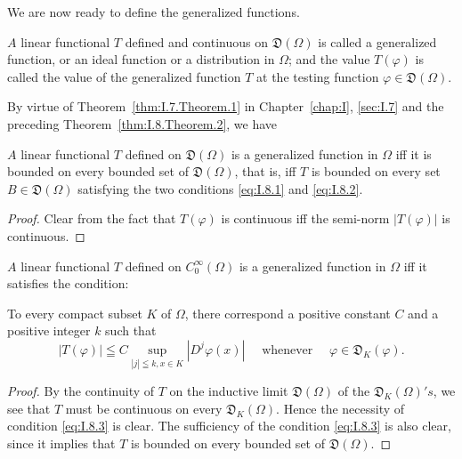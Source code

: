 We are now ready to define the generalized functions. 

\begin{definition}\label{def:I.8.Definition.1} $A$ linear functional $T$ defined and continuous on $\mathfrak{D}(\Omega)$ is called a generalized function, or an ideal function or a distribution in $\Omega$; and the value $T(\varphi)$ is called the value of the generalized function $T$ at the testing function $\varphi \in \mathfrak{D}(\Omega)$. 
\end{definition}

By virtue of Theorem~\ref{thm:I.7.Theorem.1} in Chapter~\ref{chap:I}, \ref{sec:I.7} and the preceding Theorem~\ref{thm:I.8.Theorem.2}, we have 

\begin{proposition}\label{prop:I.8.Proposition.1} $A$ linear functional $T$ defined on $\mathfrak{D}(\Omega)$ is a generalized function in $\Omega$ iff it is bounded on every bounded set of $\mathfrak{D}(\Omega)$, that is, iff $T$ is bounded on every set $B \in \mathfrak{D}(\Omega)$ satisfying the two conditions \eqref{eq:I.8.1} and \eqref{eq:I.8.2}. 
\end{proposition}

\begin{proof}
 Clear from the fact that $T(\varphi)$ is continuous iff the semi-norm $|T(\varphi)|$ is continuous. 
\end{proof}

\begin{corollaryu} $A$ linear functional $T$ defined on $C_{0}^{\infty}(\Omega)$ is a generalized function in $\Omega$ iff it satisfies the condition: 

To every compact subset $K$ of $\Omega$, there correspond a 
positive constant $C$ and a positive integer $k$ such that 
\begin{equation}\label{eq:I.8.3}
\left| T (\varphi) \right| \leqq C \sup\limits_{| j | \leqq k, x \in K} \left| D ^{j} \varphi (x) \right| \quad \text{ whenever } \quad \varphi \in \mathfrak {D}_{K} (\varphi).
\end{equation}
\end{corollaryu}

\begin{proof}
 By the continuity of $T$ on the inductive limit $\mathfrak{D}(\Omega)$ of the $\mathfrak{D}_K(\Omega)'s$, we see that $T$ must be continuous on every $\mathfrak{D}_K(\Omega)$. Hence the necessity of condition \eqref{eq:I.8.3} is clear. The sufficiency of the condition \eqref{eq:I.8.3} is also clear, since it implies that $T$ is bounded on every bounded set of $\mathfrak{D}(\Omega)$. 
\end{proof}

